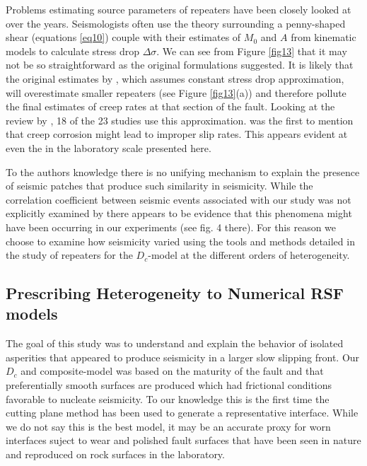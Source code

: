 \documentclass[final,3p, 11pt,authoryear]{elsarticle}
\begin{document}
Problems estimating source parameters of repeaters have been closely looked at over the years. Seismologists often use the theory surrounding a penny-shaped shear (equations \eqref{eq10}) couple with their estimates of $M_{0}$ and $A$ from kinematic models to calculate stress drop $\Delta\sigma$. We can see from Figure \ref{fig13} that it may not be so straightforward as the original formulations suggested. It is likely that the original estimates by \citet{Nadeau1998}, which assumes constant stress drop approximation, will overestimate smaller repeaters (see Figure \ref{fig13}(a)) and therefore pollute the final estimates of creep rates at that section of the fault.  Looking at the review by \citet{Uchida2019}, 18 of the 23 studies use this approximation. \citet{Beeler2001} was the first to mention that creep corrosion might lead to improper slip rates. This appears evident at even the in the laboratory scale presented here.

To the authors knowledge there is no unifying mechanism to explain the presence of seismic patches that produce such similarity in seismicity.  While the correlation coefficient between seismic events associated with our study was not explicitly examined by \citet{Selvadurai2019} there appears to be evidence that this phenomena might have been occurring in our experiments (see fig. 4 there). For this reason we choose to examine how seismicity varied using the tools and methods detailed in the study of repeaters for the $D_{c}$-model at the different orders of heterogeneity. 

\subsection{Prescribing Heterogeneity to Numerical RSF models}

The goal of this study was to understand and explain the behavior of isolated asperities that appeared to produce seismicity in a larger slow slipping front. Our $D_{c}$ and composite-model was based on the maturity of the fault and that preferentially smooth surfaces are produced which had frictional conditions favorable to nucleate seismicity.  To our knowledge this is the first time the cutting plane method has been used to generate a representative interface.  While we do not say this is the best model, it may be an accurate proxy for worn interfaces suject to wear and polished fault surfaces that have been seen in nature and reproduced on rock surfaces in the laboratory.  
\end{document}
